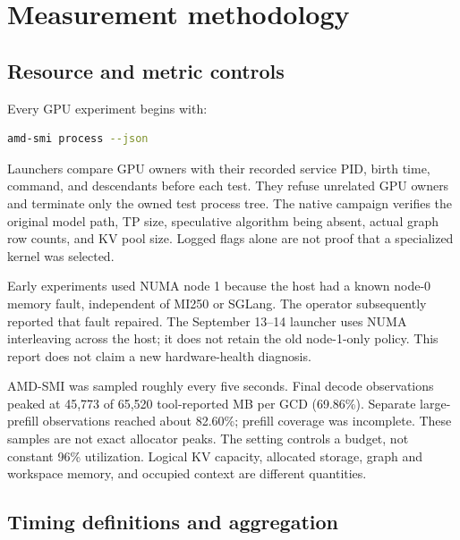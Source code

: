 \documentclass[sigplan,10pt]{acmart}
\begin{document}



\section{Measurement methodology}
\label{sec:method}

\subsection{Resource and metric controls}

Every GPU experiment begins with:

\begin{lstlisting}[language=bash]
amd-smi process --json
\end{lstlisting}

Launchers compare GPU owners with their recorded service PID, birth time, command, and descendants before each test. They refuse unrelated GPU owners and terminate only the owned test process tree. The native campaign verifies the original model path, TP size, speculative algorithm being absent, actual graph row counts, and KV pool size. Logged flags alone are not proof that a specialized kernel was selected.

Early experiments used NUMA node 1 because the host had a known node-0 memory fault, independent of MI250 or SGLang. The operator subsequently reported that fault repaired. The September 13--14 launcher uses NUMA interleaving across the host; it does not retain the old node-1-only policy. This report does not claim a new hardware-health diagnosis.

AMD-SMI was sampled roughly every five seconds. Final decode observations peaked at 45,773 of 65,520 tool-reported MB per GCD (69.86\%). Separate large-prefill observations reached about 82.60\%; prefill coverage was incomplete. These samples are not exact allocator peaks. The setting  controls a budget, not constant 96\% utilization. Logical KV capacity, allocated storage, graph and workspace memory, and occupied context are different quantities.

\subsection{Timing definitions and aggregation}
\end{document}
